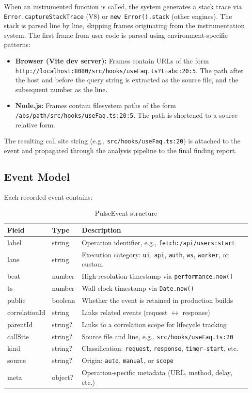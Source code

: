 \documentclass[11pt,a4paper]{article}
\begin{document}
When an instrumented function is called, the system generates a stack trace via \texttt{Error.captureStackTrace} (V8) or \texttt{new Error().stack} (other engines). The stack is parsed line by line, skipping frames originating from the instrumentation system. The first frame from user code is parsed using environment-specific patterns:

\begin{itemize}
  \item \textbf{Browser (Vite dev server):} Frames contain URLs of the form \texttt{http://localhost:8080/src/hooks/useFaq.ts?t=abc:20:5}. The path after the host and before the query string is extracted as the source file, and the subsequent number as the line.
  \item \textbf{Node.js:} Frames contain filesystem paths of the form \texttt{/abs/path/src/hooks/useFaq.ts:20:5}. The path is shortened to a source-relative form.
\end{itemize}

The resulting call site string (e.g., \texttt{src/hooks/useFaq.ts:20}) is attached to the event and propagated through the analysis pipeline to the final finding report.

\subsection{Event Model}

Each recorded event contains:

\begin{table}[h]
\centering
\small
\begin{tabular}{lll}
\toprule
\textbf{Field} & \textbf{Type} & \textbf{Description} \\
\midrule
label & string & Operation identifier, e.g., \texttt{fetch:/api/users:start} \\
lane & string & Execution category: \texttt{ui}, \texttt{api}, \texttt{auth}, \texttt{ws}, \texttt{worker}, or custom \\
beat & number & High-resolution timestamp via \texttt{performance.now()} \\
ts & number & Wall-clock timestamp via \texttt{Date.now()} \\
public & boolean & Whether the event is retained in production builds \\
correlationId & string & Links related events (request $\leftrightarrow$ response) \\
parentId & string? & Links to a correlation scope for lifecycle tracking \\
callSite & string? & Source file and line, e.g., \texttt{src/hooks/useFaq.ts:20} \\
kind & string? & Classification: \texttt{request}, \texttt{response}, \texttt{timer-start}, etc. \\
source & string? & Origin: \texttt{auto}, \texttt{manual}, or \texttt{scope} \\
meta & object? & Operation-specific metadata (URL, method, delay, etc.) \\
\bottomrule
\end{tabular}
\caption{PulseEvent structure}
\label{tab:event}
\end{table}
\end{document}
